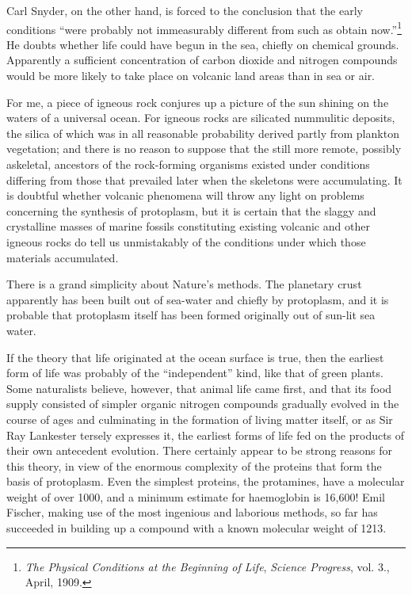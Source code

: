\documentclass[a4paper, 12pt, oneside]{article}
\begin{document}
Carl Snyder, on the other hand, is forced to the conclusion that the early conditions ``were probably not immeasurably different from such as obtain now.''\footnote{\emph{The Physical Conditions at the Beginning of Life}, \emph{Science Progress}, vol. 3., April, 1909.} He doubts whether life could have begun in the sea, chiefly on chemical grounds. Apparently a sufficient concentration of carbon dioxide and nitrogen compounds would be more likely to take place on volcanic land areas than in sea or air.

For me, a piece of igneous rock conjures up a picture of the sun shining on the waters of a universal ocean. For igneous rocks are silicated nummulitic deposits, the silica of which was in all reasonable probability derived partly from plankton vegetation; and there is no reason to suppose that the still more remote, possibly askeletal, ancestors of the rock-forming organisms existed under conditions differing from those that prevailed later when the skeletons were accumulating. It is doubtful whether volcanic phenomena will throw any light on problems concerning the synthesis of protoplasm, but it is certain that the slaggy and crystalline masses of marine fossils constituting existing volcanic and other igneous rocks do tell us unmistakably of the conditions under which those materials accumulated.

There is a grand simplicity about Nature's methods. The planetary crust apparently has been built out of sea-water and chiefly by protoplasm, and it is probable that protoplasm itself has been formed originally out of sun-lit sea water.

If the theory that life originated at the ocean surface is true, then the earliest form of life was probably of the ``independent'' kind, like that of green plants. Some naturalists believe, however, that animal life came first, and that its food supply consisted of simpler organic nitrogen compounds gradually evolved in the course of ages and culminating in the formation of living matter itself, or as Sir Ray Lankester tersely expresses it, the earliest forms of life fed on the products of their own antecedent evolution. There certainly appear to be strong reasons for this theory, in view of the enormous complexity of the proteins that form the basis of protoplasm. Even the simplest proteins, the protamines, have a molecular weight of over 1000, and a minimum estimate for haemoglobin is 16,600! Emil Fischer, making use of the most ingenious and laborious methods, so far has succeeded in building up a compound with a known molecular weight of 1213.
\end{document}
